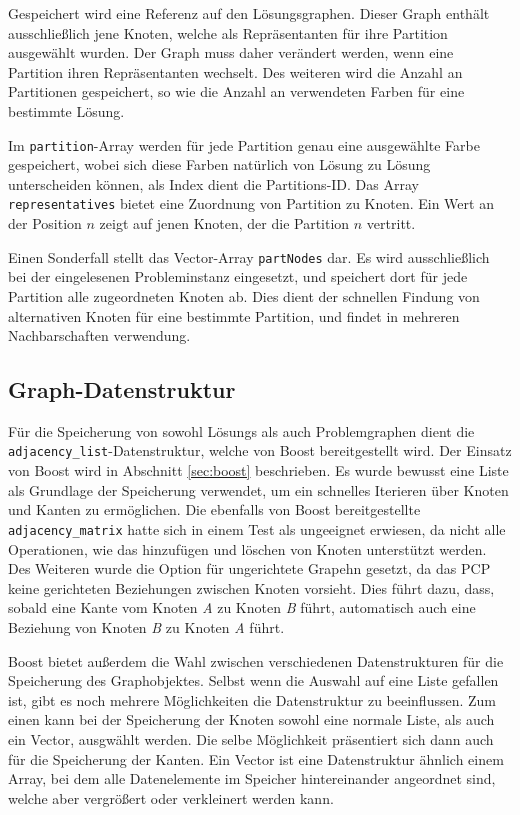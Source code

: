 Gespeichert wird eine Referenz auf den Lösungsgraphen. Dieser Graph enthält ausschließlich jene Knoten, welche als Repräsentanten für ihre Partition
ausgewählt wurden. Der Graph muss daher verändert werden, wenn eine Partition ihren Repräsentanten wechselt. Des weiteren wird die Anzahl an Partitionen
gespeichert, so wie die Anzahl an verwendeten Farben für eine bestimmte Lösung. 

Im \texttt{partition}-Array werden für jede Partition genau eine ausgewählte Farbe gespeichert, wobei sich diese Farben natürlich von Lösung zu Lösung 
unterscheiden können, als Index dient die Partitions-ID. Das Array \texttt{representatives} bietet eine Zuordnung von Partition zu Knoten. Ein Wert 
an der Position $n$ zeigt auf jenen Knoten, der die Partition $n$ vertritt.

Einen Sonderfall stellt das Vector-Array \texttt{partNodes} dar. Es wird ausschließlich bei der eingelesenen Probleminstanz eingesetzt, und speichert
dort für jede Partition alle zugeordneten Knoten ab. Dies dient der schnellen Findung von alternativen Knoten für eine bestimmte Partition, und findet
in mehreren Nachbarschaften verwendung. 

\subsection{Graph-Datenstruktur}
Für die Speicherung von sowohl Lösungs als auch Problemgraphen dient die \texttt{adjacency\_list}-Datenstruktur, welche von Boost bereitgestellt wird. Der Einsatz von Boost wird in Abschnitt \ref{sec:boost} 
beschrieben. Es wurde bewusst eine Liste als Grundlage der Speicherung verwendet, um ein schnelles Iterieren über Knoten und Kanten zu ermöglichen. Die ebenfalls von Boost bereitgestellte 
\texttt{adjacency\_matrix} hatte sich in einem Test als ungeeignet erwiesen, da nicht alle Operationen, wie das hinzufügen und löschen von Knoten unterstützt werden. Des Weiteren wurde die Option für 
ungerichtete Grapehn gesetzt, da das PCP keine gerichteten Beziehungen zwischen Knoten vorsieht. Dies führt dazu, dass, sobald eine Kante vom Knoten \textit{A} zu Knoten \textit{B} führt, automatisch auch
eine Beziehung von Knoten \textit{B} zu Knoten \textit{A} führt.

Boost bietet außerdem die Wahl zwischen verschiedenen Datenstrukturen für die Speicherung des Graphobjektes. Selbst wenn die Auswahl auf eine Liste gefallen ist, gibt es noch mehrere Möglichkeiten die Datenstruktur
zu beeinflussen. Zum einen kann bei der Speicherung der Knoten sowohl eine normale Liste, als auch ein Vector, ausgwählt werden. Die selbe Möglichkeit präsentiert sich dann auch für die Speicherung der Kanten.
Ein Vector ist eine Datenstruktur ähnlich einem Array, bei dem alle Datenelemente im Speicher hintereinander angeordnet sind, welche aber vergrößert oder verkleinert werden kann.

